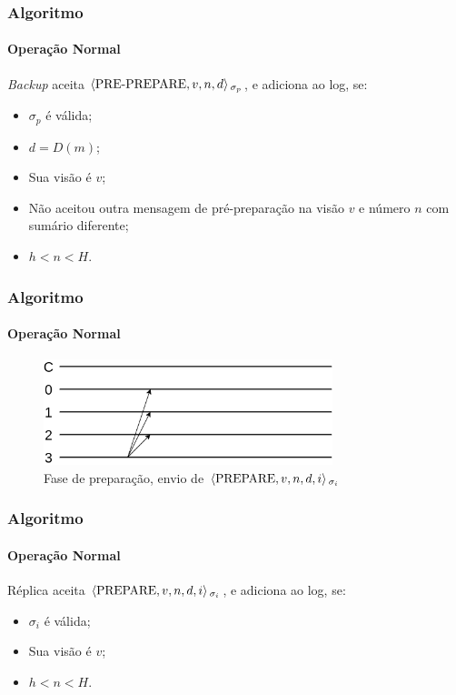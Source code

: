 \documentclass{beamer}
\begin{document}
\begin{frame}
  \frametitle{Algoritmo}
  \framesubtitle{Operação Normal}

  \textit{Backup} aceita $\braket{\text{PRE-PREPARE}, v, n, d}{}_{\sigma_p}$, e adiciona ao log, se:
  \begin{itemize}
    \item
      $\sigma_p$ é válida;
      
    \item
      $d = D(m)$;

    \item
      Sua visão é $v$;

    \item
      Não aceitou outra mensagem de pré-preparação na visão $v$ e número $n$ com sumário diferente;

    \item
      $h < n < H$.
  \end{itemize}
\end{frame}

\begin{frame}
  \frametitle{Algoritmo}
  \framesubtitle{Operação Normal}

  \begin{figure}
    \includegraphics[width=0.75\textwidth]{images/prepare}
    \caption{Fase de preparação, envio de $\braket{\text{PREPARE}, v, n, d, i}{}_{\sigma_i}$}
  \end{figure}
\end{frame}

\begin{frame}
  \frametitle{Algoritmo}
  \framesubtitle{Operação Normal}

  Réplica aceita $\braket{\text{PREPARE}, v, n, d, i}{}_{\sigma_i}$, e adiciona ao log, se:
  \begin{itemize}
    \item
      $\sigma_i$ é válida;

    \item
      Sua visão é $v$;

    \item
      $h < n < H$.
  \end{itemize}
\end{frame}
\end{document}
